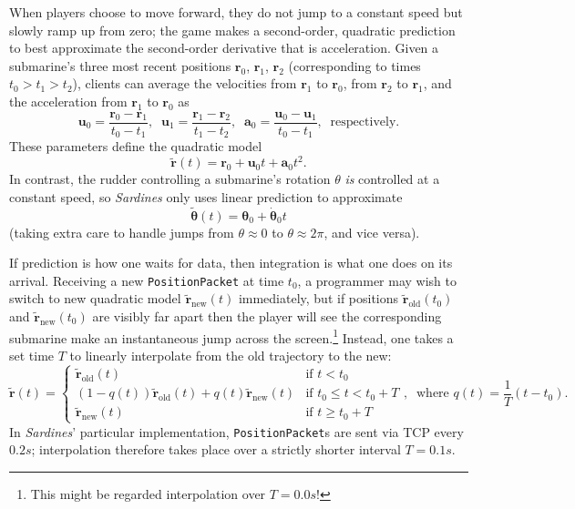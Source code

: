 \documentclass[a4paper, 9pt]{article}
\begin{document}
\begin{flushleft}
\vspace{5pt}\noindent
When players choose to move forward, they do not jump to a constant speed but slowly ramp up from zero; the game makes a second-order, quadratic prediction to best approximate the second-order derivative that is acceleration. Given a submarine's three most recent positions $\mathbf{r}_0$, $\mathbf{r}_1$, $\mathbf{r}_2$ (corresponding to times $t_0 > t_1 > t_2$), clients can average the velocities from $\mathbf{r}_1$ to $\mathbf{r}_0$, from $\mathbf{r}_2$ to $\mathbf{r}_1$, and the acceleration from $\mathbf{r}_1$ to $\mathbf{r}_0$ as
$$\mathbf{u}_0 = \frac{\mathbf{r}_0-\mathbf{r}_1}{t_0-t_1}, \;\; \mathbf{u}_1 = \frac{\mathbf{r}_1-\mathbf{r}_2}{t_1-t_2}, \;\; \mathbf{a}_0 = \frac{\mathbf{u}_0-\mathbf{u}_1}{t_0-t_1}, \;\; \textrm{respectively.}$$
These parameters define the quadratic model
$$ \mathbf{\tilde{r}}(t) = \mathbf{r}_0+\mathbf{u}_0t+\mathbf{a}_0t^2.$$
In contrast, the rudder controlling a submarine's rotation $\theta$ \textit{is} controlled at a constant speed, so \textit{Sardines} only uses linear prediction to approximate
$$\mathbf{\tilde{\theta}}(t) = \mathbf{\theta}_0+\mathbf{\dot{\theta}}_0t$$
(taking extra care to handle jumps from $\theta \approx 0$ to $\theta \approx 2\pi$, and vice versa).


\vspace{5pt}\noindent
If prediction is how one waits for data, then integration is what one does on its arrival. Receiving a new \texttt{PositionPacket} at time $t_0$, a programmer may wish to switch to new quadratic model $\mathbf{\tilde{r}}_{\textrm{new}}(t)$ immediately, but if positions $\mathbf{\tilde{r}}_{\textrm{old}}(t_0)$ and $\mathbf{\tilde{r}}_{\textrm{new}}(t_0)$ are visibly far apart then the player will see the corresponding submarine make an instantaneous jump across the screen.\footnote{This might be regarded interpolation over $T = 0.0s$!} Instead, one takes a set time $T$ to linearly interpolate from the old trajectory to the new:
$$\mathbf{\tilde{r}}(t) = \begin{cases} 
\mathbf{\tilde{r}}_{\textrm{old}}(t) & \textrm{if $t < t_0$} \\
(1-q(t))\mathbf{\tilde{r}}_{\textrm{old}}(t) + q(t)\mathbf{\tilde{r}}_{\textrm{new}}(t) & \textrm{if $t_0 \leq t < t_0+T$} \\
\mathbf{\tilde{r}}_{\textrm{new}}(t) & \textrm{if $t \geq t_0+T$}
\end{cases}, \;\; \textrm{where $q(t) = \frac{1}{T}\left(t-t_0\right)$.}$$
In \textit{Sardines}' particular implementation, \texttt{PositionPacket}s are sent via TCP every $0.2s$; interpolation therefore takes place over a strictly shorter interval $T = 0.1s$. 


\end{flushleft}
\end{document}

